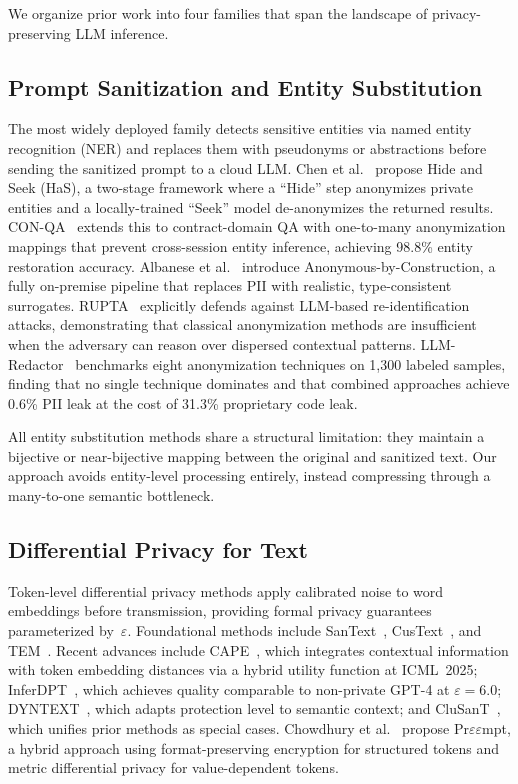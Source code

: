 \documentclass[sigconf,balance=false]{acmart}
\begin{document}
We organize prior work into four families that span the landscape of privacy-preserving LLM inference.

\subsection{Prompt Sanitization and Entity Substitution}
\label{sec:rw-entity}

The most widely deployed family detects sensitive entities via named entity recognition (NER) and replaces them with pseudonyms or abstractions before sending the sanitized prompt to a cloud LLM.
Chen et al.~\cite{chen2023} propose Hide and Seek (HaS), a two-stage framework where a ``Hide'' step anonymizes private entities and a locally-trained ``Seek'' model de-anonymizes the returned results.
CON-QA~\cite{conqa2025} extends this to contract-domain QA with one-to-many anonymization mappings that prevent cross-session entity inference, achieving 98.8\% entity restoration accuracy.
Albanese et al.~\cite{albanese2026} introduce Anonymous-by-Construction, a fully on-premise pipeline that replaces PII with realistic, type-consistent surrogates.
RUPTA~\cite{yang2025} explicitly defends against LLM-based re-identification attacks, demonstrating that classical anonymization methods are insufficient when the adversary can reason over dispersed contextual patterns.
LLM-Redactor~\cite{agyemang2026} benchmarks eight anonymization techniques on 1,300 labeled samples, finding that no single technique dominates and that combined approaches achieve 0.6\% PII leak at the cost of 31.3\% proprietary code leak.

All entity substitution methods share a structural limitation: they maintain a bijective or near-bijective mapping between the original and sanitized text. Our approach avoids entity-level processing entirely, instead compressing through a many-to-one semantic bottleneck.

\subsection{Differential Privacy for Text}
\label{sec:rw-dp}

Token-level differential privacy methods apply calibrated noise to word embeddings before transmission, providing formal privacy guarantees parameterized by~$\varepsilon$.
Foundational methods include SanText~\cite{yue2021}, CusText~\cite{chen2023custext}, and TEM~\cite{tem2021}.
Recent advances include CAPE~\cite{cape2025}, which integrates contextual information with token embedding distances via a hybrid utility function at ICML~2025; InferDPT~\cite{inferdpt2023}, which achieves quality comparable to non-private GPT-4 at $\varepsilon = 6.0$; DYNTEXT~\cite{dyntext2025}, which adapts protection level to semantic context; and CluSanT~\cite{clusant2025}, which unifies prior methods as special cases.
Chowdhury et al.~\cite{chowdhury2025} propose Pr$\varepsilon\varepsilon$mpt, a hybrid approach using format-preserving encryption for structured tokens and metric differential privacy for value-dependent tokens.
\end{document}
